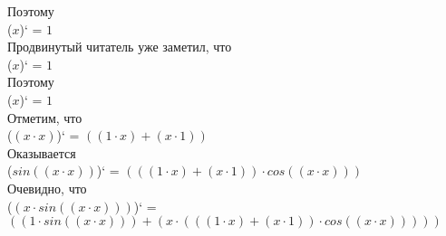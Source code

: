 \documentclass[12pt,a4paper,fleqn]{article}
\begin{document}
Поэтому\\
($x$)` = $1$\\
Продвинутый читатель уже заметил, что\\
($x$)` = $1$\\
Поэтому\\
($x$)` = $1$\\
Отметим, что\\
($(x \cdot x)$)` = $((1 \cdot x) + (x \cdot 1))$\\
Оказывается\\
($sin((x \cdot x))$)` = $(((1 \cdot x) + (x \cdot 1)) \cdot cos((x \cdot x)))$\\
Очевидно, что\\
($(x \cdot sin((x \cdot x)))$)` = $((1 \cdot sin((x \cdot x))) + (x \cdot (((1 \cdot x) + (x \cdot 1)) \cdot cos((x \cdot x)))))$\\
\end{document}
